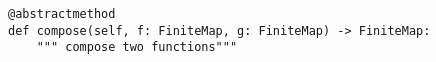 \par\begin{minipage}{60ex}
\begin{verbatim}
@abstractmethod
def compose(self, f: FiniteMap, g: FiniteMap) -> FiniteMap:
    """ compose two functions"""
\end{verbatim}
\end{minipage}\par